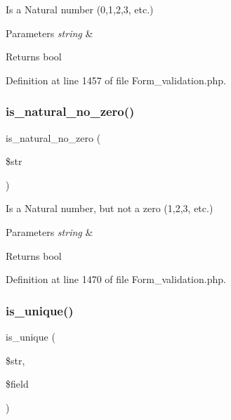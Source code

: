 Is a Natural number (0,1,2,3, etc.)


\begin{DoxyParams}{Parameters}
{\em string} & \\
\hline
\end{DoxyParams}
\begin{DoxyReturn}{Returns}
bool 
\end{DoxyReturn}


Definition at line 1457 of file Form\+\_\+validation.\+php.

\mbox{\label{class_c_i___form__validation_ae4f399db6305e565bcf9acd70eea86a6}} 
\subsubsection{\texorpdfstring{is\_natural\_no\_zero()}{is\_natural\_no\_zero()}}
{\footnotesize\ttfamily is\+\_\+natural\+\_\+no\+\_\+zero (\begin{DoxyParamCaption}\item[{}]{\$str }\end{DoxyParamCaption})}

Is a Natural number, but not a zero (1,2,3, etc.)


\begin{DoxyParams}{Parameters}
{\em string} & \\
\hline
\end{DoxyParams}
\begin{DoxyReturn}{Returns}
bool 
\end{DoxyReturn}


Definition at line 1470 of file Form\+\_\+validation.\+php.

\mbox{\label{class_c_i___form__validation_a1a5ee6b60f419248ca8796444aea3a78}} 
\subsubsection{\texorpdfstring{is\_unique()}{is\_unique()}}
{\footnotesize\ttfamily is\+\_\+unique (\begin{DoxyParamCaption}\item[{}]{\$str,  }\item[{}]{\$field }\end{DoxyParamCaption})}

